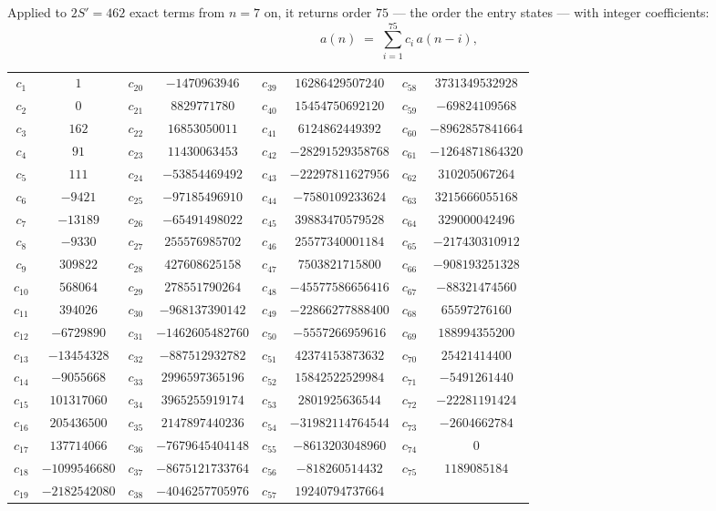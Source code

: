 \documentclass[11pt,a4paper]{article}
\theoremstyle{plain}
\theoremstyle{definition}
\begin{document}
Applied to $2S'=462$ exact terms from $n=7$ on, it returns order $75$ --- the
order the entry states --- with integer coefficients:
\[
a(n)\;=\;\sum_{i=1}^{75}c_i\,a(n-i),
\]
\begin{center}\small
\begin{tabular}{cccccccc}
$c_{1}$ & $1$ & $c_{20}$ & $-1470963946$ & $c_{39}$ & $16286429507240$ & $c_{58}$ & $3731349532928$ \\
$c_{2}$ & $0$ & $c_{21}$ & $8829771780$ & $c_{40}$ & $15454750692120$ & $c_{59}$ & $-69824109568$ \\
$c_{3}$ & $162$ & $c_{22}$ & $16853050011$ & $c_{41}$ & $6124862449392$ & $c_{60}$ & $-8962857841664$ \\
$c_{4}$ & $91$ & $c_{23}$ & $11430063453$ & $c_{42}$ & $-28291529358768$ & $c_{61}$ & $-1264871864320$ \\
$c_{5}$ & $111$ & $c_{24}$ & $-53854469492$ & $c_{43}$ & $-22297811627956$ & $c_{62}$ & $310205067264$ \\
$c_{6}$ & $-9421$ & $c_{25}$ & $-97185496910$ & $c_{44}$ & $-7580109233624$ & $c_{63}$ & $3215666055168$ \\
$c_{7}$ & $-13189$ & $c_{26}$ & $-65491498022$ & $c_{45}$ & $39883470579528$ & $c_{64}$ & $329000042496$ \\
$c_{8}$ & $-9330$ & $c_{27}$ & $255576985702$ & $c_{46}$ & $25577340001184$ & $c_{65}$ & $-217430310912$ \\
$c_{9}$ & $309822$ & $c_{28}$ & $427608625158$ & $c_{47}$ & $7503821715800$ & $c_{66}$ & $-908193251328$ \\
$c_{10}$ & $568064$ & $c_{29}$ & $278551790264$ & $c_{48}$ & $-45577586656416$ & $c_{67}$ & $-88321474560$ \\
$c_{11}$ & $394026$ & $c_{30}$ & $-968137390142$ & $c_{49}$ & $-22866277888400$ & $c_{68}$ & $65597276160$ \\
$c_{12}$ & $-6729890$ & $c_{31}$ & $-1462605482760$ & $c_{50}$ & $-5557266959616$ & $c_{69}$ & $188994355200$ \\
$c_{13}$ & $-13454328$ & $c_{32}$ & $-887512932782$ & $c_{51}$ & $42374153873632$ & $c_{70}$ & $25421414400$ \\
$c_{14}$ & $-9055668$ & $c_{33}$ & $2996597365196$ & $c_{52}$ & $15842522529984$ & $c_{71}$ & $-5491261440$ \\
$c_{15}$ & $101317060$ & $c_{34}$ & $3965255919174$ & $c_{53}$ & $2801925636544$ & $c_{72}$ & $-22281191424$ \\
$c_{16}$ & $205436500$ & $c_{35}$ & $2147897440236$ & $c_{54}$ & $-31982114764544$ & $c_{73}$ & $-2604662784$ \\
$c_{17}$ & $137714066$ & $c_{36}$ & $-7679645404148$ & $c_{55}$ & $-8613203048960$ & $c_{74}$ & $0$ \\
$c_{18}$ & $-1099546680$ & $c_{37}$ & $-8675121733764$ & $c_{56}$ & $-818260514432$ & $c_{75}$ & $1189085184$ \\
$c_{19}$ & $-2182542080$ & $c_{38}$ & $-4046257705976$ & $c_{57}$ & $19240794737664$ &  &  \\
\end{tabular}
\end{center}
\end{document}
